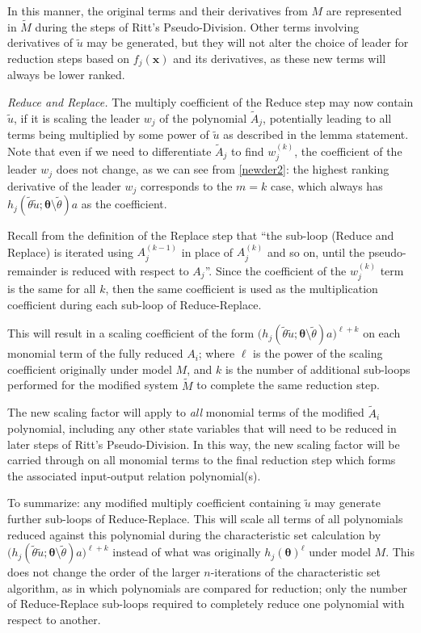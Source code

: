 \documentclass[a4paper,fleqn]{cas-dc}
\theoremstyle{definition}
\begin{document}
\begin{pf}
    In this manner, the original terms and their derivatives from $M$ are represented in $\tilde{M}$ during the steps of Ritt's Pseudo-Division.
    Other terms involving derivatives of $\tilde{u}$ may be generated, but they will not alter the choice of leader for reduction steps based on $f_j(\pmb{x})$ and its derivatives, as these new terms will always be lower ranked.
    
    \vspace{0.2cm}
    \noindent \textit{Reduce and Replace.} 
    The multiply coefficient of the Reduce step may now contain $\tilde{u}$, if it is scaling the leader $w_j$ of the polynomial $\tilde{A}_j$, potentially leading to all terms being multiplied by some power of $\tilde{u}$ as described in the lemma statement.
    Note that even if we need to differentiate $\tilde{A}_j$ to find $w_j^{(k)}$, the coefficient of the leader $w_j$ does not change, as we can see from \cref{newder2}:
    the highest ranking derivative of the leader $w_j$ corresponds to the $m=k$ case, which always has $h_j(\tilde{\theta} \tilde{u}; \pmb{\theta}\setminus \tilde{\theta}) a$ as the coefficient.

    Recall from the definition of the Replace step that ``the sub-loop (Reduce and Replace) is iterated using $A_j^{(k-1)}$ in place of $A_j^{(k)}$ and so on, until the pseudo-remainder is reduced with respect to $A_j$''.
    Since the coefficient of the $w_j^{(k)}$ term is the same for all $k$, then the same coefficient is used as the multiplication coefficient during each sub-loop of Reduce-Replace.

    This will result in a scaling coefficient of the form $\big(h_j(\tilde{\theta} \tilde{u}; \pmb{\theta}\setminus \tilde{\theta})a\big)^{\ell+k}$ on each monomial term of the fully reduced $A_i$; where $\ell$ is the power of the scaling coefficient originally under model $M$, and $k$ is the number of additional sub-loops performed for the modified system $\tilde{M}$ to complete the same reduction step.

    The new scaling factor will apply to \textit{all} monomial terms of the modified $\tilde{A}_i$ polynomial, including any other state variables that will need to be reduced in later steps of Ritt's Pseudo-Division. 
    In this way, the new scaling factor will be carried through on all monomial terms to the final reduction step which forms the associated input-output relation polynomial(s).

    
    To summarize: any modified multiply coefficient containing $\tilde{u}$ may generate further sub-loops of Reduce-Replace. 
    This will scale all terms of all polynomials reduced against this polynomial during the characteristic set calculation by $\big(h_j(\tilde{\theta} \tilde{u}; \pmb{\theta}\setminus \tilde{\theta})a\big)^{\ell+k}$ instead of what was originally $h_j(\pmb{\theta})^{\ell}$ under model $M$.
    This does not change the order of the larger $n$-iterations of the characteristic set algorithm, as in which polynomials are compared for reduction; only the number of Reduce-Replace sub-loops required to completely reduce one polynomial with respect to another.


\end{pf}
\end{document}
